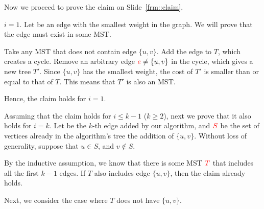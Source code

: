 \documentclass{beamer}
\def\vgap{\vspace{5mm}}
\begin{document}
\begin{frame}
\begin{small} 
    
    \vgap 
    
    Now we proceed to prove the claim on Slide~\ref{frm::claim}. 
    
    \vgap 
    
     $i = 1$. Let  be an edge with the smallest weight in the graph. We will prove that the edge must exist in some MST. 
    
    \vgap 
    
    Take any MST  that does not contain edge $\{u, v\}$. Add the edge to $T$, which creates a cycle. Remove an arbitrary edge $\textcolor{red}{e} \neq \{u, v\}$ in the cycle, which gives a new tree $T'$. Since $\{u, v\}$ has the smallest weight, the cost of $T'$ is smaller than or equal to that of $T$. This means that $T'$ is also an MST.
    
    \vgap 
    
    Hence, the claim holds for $i = 1$. 
\end{small}     
\end{frame}
\begin{frame}
\begin{small} 
    
     Assuming that the claim holds for $i \le k - 1$ ($k \ge 2$), next we prove that it also holds for $i = k$. Let  be the $k$-th edge added by our algorithm, and $\textcolor{red}{S}$ be the set of vertices already in the algorithm's tree  the addition of $\{u, v\}$. Without loss of generality, suppose that $u \in S$, and $v \notin S$.  
    
    \vgap 
    
    By the inductive assumption, we know that there is some MST $\textcolor{red}{T}$ that includes all the first $k - 1$ edges. If $T$ also includes edge $\{u, v\}$, then the claim already holds. 
    
    \vgap 
    
    Next, we consider the case where $T$ does not have $\{u, v\}$. 
\end{small}     
\end{frame}
\end{document}
